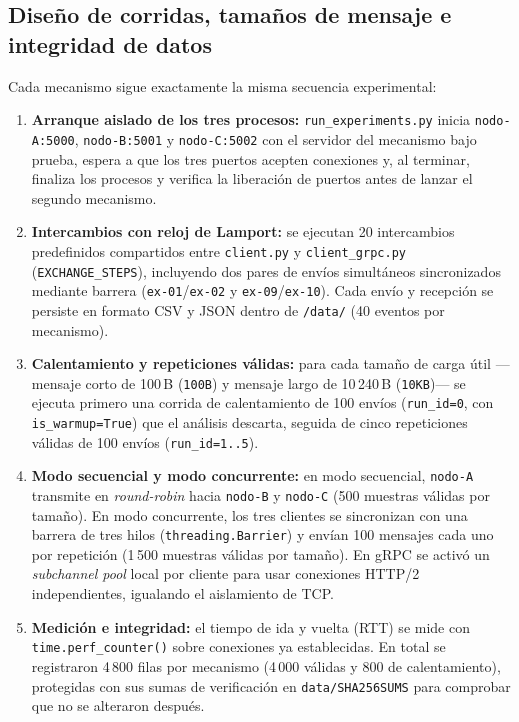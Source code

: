 \subsection{Diseño de corridas, tamaños de mensaje e integridad de datos}

Cada mecanismo sigue exactamente la misma secuencia experimental:
\begin{enumerate}
  \item \textbf{Arranque aislado de los tres procesos:} \texttt{run\_experiments.py} inicia \texttt{nodo-A:5000}, \texttt{nodo-B:5001} y \texttt{nodo-C:5002} con el servidor del mecanismo bajo prueba, espera a que los tres puertos acepten conexiones y, al terminar, finaliza los procesos y verifica la liberación de puertos antes de lanzar el segundo mecanismo.
  \item \textbf{Intercambios con reloj de Lamport:} se ejecutan 20 intercambios predefinidos compartidos entre \texttt{client.py} y \texttt{client\_grpc.py} (\texttt{EXCHANGE\_STEPS}), incluyendo dos pares de envíos simultáneos sincronizados mediante barrera (\texttt{ex-01}/\texttt{ex-02} y \texttt{ex-09}/\texttt{ex-10}). Cada envío y recepción se persiste en formato CSV y JSON dentro de \texttt{/data/} (40 eventos por mecanismo).
  \item \textbf{Calentamiento y repeticiones válidas:} para cada tamaño de carga útil ---mensaje corto de 100\,B (\texttt{100B}) y mensaje largo de 10\,240\,B (\texttt{10KB})--- se ejecuta primero una corrida de calentamiento de 100 envíos (\texttt{run\_id=0}, con \texttt{is\_warmup=True}) que el análisis descarta, seguida de cinco repeticiones válidas de 100 envíos (\texttt{run\_id=1..5}).
  \item \textbf{Modo secuencial y modo concurrente:} en modo secuencial, \texttt{nodo-A} transmite en \emph{round-robin} hacia \texttt{nodo-B} y \texttt{nodo-C} (500 muestras válidas por tamaño). En modo concurrente, los tres clientes se sincronizan con una barrera de tres hilos (\texttt{threading.Barrier}) y envían 100 mensajes cada uno por repetición (1\,500 muestras válidas por tamaño). En gRPC se activó un \emph{subchannel pool} local por cliente para usar conexiones HTTP/2 independientes, igualando el aislamiento de TCP.
  \item \textbf{Medición e integridad:} el tiempo de ida y vuelta (RTT) se mide con \texttt{time.perf\_counter()} sobre conexiones ya establecidas. En total se registraron 4\,800 filas por mecanismo (4\,000 válidas y 800 de calentamiento), protegidas con sus sumas de verificación en \texttt{data/SHA256SUMS} para comprobar que no se alteraron después.
\end{enumerate}

